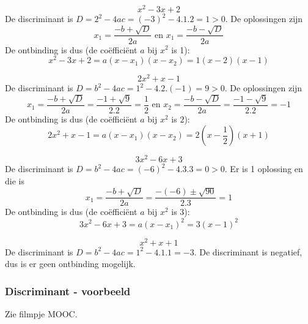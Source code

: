 \begin{voorbeeld}
	\begin{equation*}
	x^2-3x+2
	\end{equation*}
	De discriminant is $D=2^2-4ac=(-3)^2-4.1.2=1>0$. De oplossingen zijn
	\begin{equation*}
	x_1=\frac{-b+\sqrt{D}}{2a} \text{ en } x_1=\frac{-b-\sqrt{D}}{2a}
	\end{equation*}
De ontbinding is dus (de co\"effici\"ent $a$ bij $x^2$ is 1):
\begin{equation*}
x^2-3x+2=a(x-x_1)(x-x_2)=1(x-2)(x-1)
\end{equation*}
\end{voorbeeld}
\begin{voorbeeld}
\begin{equation*}
2x^2+x-1
\end{equation*}
De discriminant is $D=b^2-4ac=1^2-4.2.(-1)=9>0$. De oplossingen zijn
\begin{equation*}
x_1 = \frac{-b + \sqrt{D}}{2a}=\frac{-1+\sqrt{9}}{2.2}=\frac{1}{2} \text{ en } x_2 = \frac{-b - \sqrt{D}}{2a}=\frac{-1-\sqrt{9}}{2.2}=-1
\end{equation*}
De ontbinding is dus (de co\"effici\"ent $a$ bij $x^2$ is $2$):
\begin{equation*}
2x^2+x-1=a(x-x_1)(x-x_2)=2(x-\frac{1}{2})(x+1)
\end{equation*}
\end{voorbeeld}
\begin{voorbeeld}
\begin{equation*}
3x^2-6x+3
\end{equation*}
	De discriminant is $D=b^2-4ac=(-6)^2-4.3.3=0>0$. Er is 1 oplossing en die is
	\begin{equation*}
	x_1 = \frac{-b + \sqrt{D}}{2a}=\frac{-(-6)\pm\sqrt{90}}{2.3}=1
	\end{equation*}
De ontbinding is dus (de co\"effici\"ent $a$ bij $x^2$ is 3):
\begin{equation*}
3x^2-6x+3 = a(x-x_1)^2=3(x-1)^2
\end{equation*}
\end{voorbeeld}
\begin{voorbeeld}
	\begin{equation*}
	x^2+x+1
	\end{equation*}
	De discriminant is $D=b^2-4ac=1^2-4.1.1=-3$. De discriminant is negatief, dus is er geen ontbinding mogelijk.
\end{voorbeeld}


\subsubsection{Discriminant - voorbeeld}
Zie filmpje MOOC.

